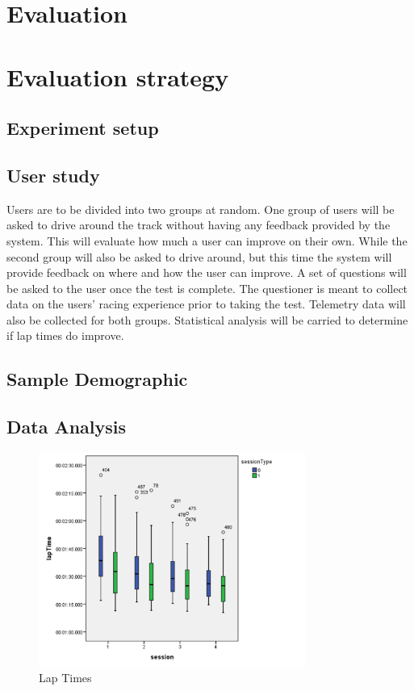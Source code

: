 \section{Evaluation}


\section{Evaluation strategy}

\subsection{Experiment setup}

\subsection{User study}
Users are to be divided into two groups at random. One group of users will be asked to drive around the track without having any feedback provided by the system. This will evaluate how much a user can improve on their own. While the second group will also be asked to drive around, but this time the system will provide feedback on where and how the user can improve. A set of questions will be asked to the user once the test is complete. The questioner is meant to collect data on the users' racing experience prior to taking the test. Telemetry data will also be collected for both groups. Statistical analysis will be carried to determine if lap times do improve. 

\subsection{Sample Demographic}

\subsection{Data Analysis}

\begin{figure}[!htb]
	\centering
	\includegraphics[height=7cm]{images/LapTimes}
	\caption{Lap Times}
	\label{fig:LapTimes}
\end{figure}

